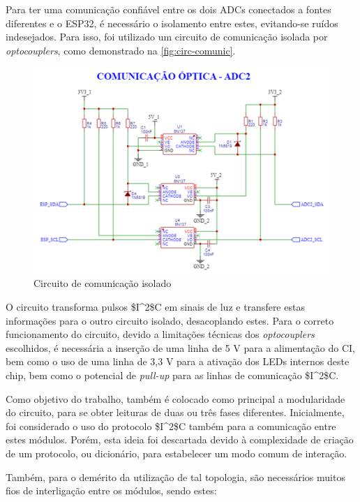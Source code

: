 Para ter uma comunicação confiável entre os dois \gls{ADC}s conectados a fontes diferentes e o ESP32, é necessário o isolamento entre estes, evitando-se ruídos indesejados. Para isso, foi utilizado um circuito de comunicação isolada por \textit{optocouplers}, como demonstrado na \autoref{fig:circ-comunic}.

\begin{figure}[htb!]
    \caption{Circuito de comunicação isolado}
    \label{fig:circ-comunic}
    \includegraphics[width=1.0\textwidth]{figuras/circ-comunic.png}
    \fonte{}
\end{figure}

O circuito transforma pulsos \gls{$I^2$C} em sinais de luz e transfere estas informações para o outro circuito isolado, desacoplando estes. Para o correto funcionamento do circuito, devido a limitações técnicas dos \textit{optocouplers} escolhidos, é necessária a inserção de uma linha de 5 V para a alimentação do \gls{CI}, bem como o uso de uma linha de 3,3 V para a ativação dos LEDs internos deste chip, bem como o potencial de \textit{pull-up} para as linhas de comunicação \gls{$I^2$C}.

Como objetivo do trabalho, também é colocado como principal a modularidade do circuito, para se obter leituras de duas ou três fases diferentes. Inicialmente, foi considerado o uso do protocolo \gls{$I^2$C} também para a comunicação entre estes módulos. Porém, esta ideia foi descartada devido à complexidade de criação de um protocolo, ou dicionário, para estabelecer um modo comum de interação.

Também, para o demérito da utilização de tal topologia, são necessários muitos fios de interligação entre os módulos, sendo estes:

